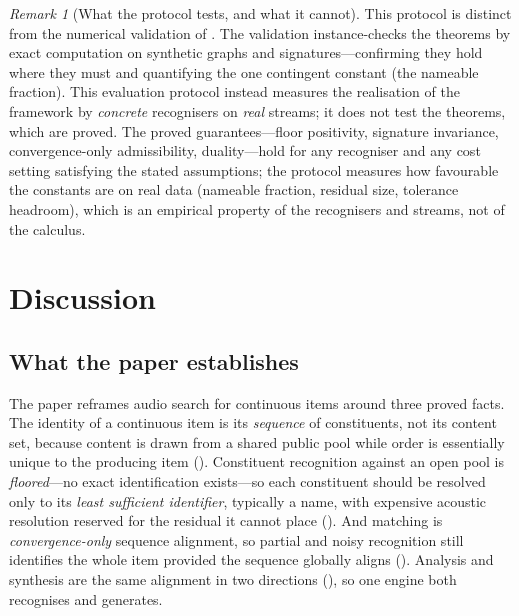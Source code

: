 \documentclass[11pt,twocolumn,a4paper]{article}
\theoremstyle{thmstyle}
\theoremstyle{definition}
\theoremstyle{remark}
\newtheorem{remark}[theorem]{Remark}
\begin{document}
\begin{remark}[What the protocol tests, and what it cannot]
\label{rem:eval-scope}
This protocol is distinct from the numerical validation of .
The validation instance-checks the theorems by exact computation on synthetic
graphs and signatures---confirming they hold where they must and quantifying the
one contingent constant (the nameable fraction). This evaluation protocol instead
measures the realisation of the framework by \emph{concrete} recognisers on
\emph{real} streams; it does not test the theorems, which are proved. The proved
guarantees---floor positivity, signature invariance, convergence-only
admissibility, duality---hold for any recogniser and any cost setting satisfying
the stated assumptions; the protocol measures how favourable the constants are on
real data (nameable fraction, residual size, tolerance headroom), which is an
empirical property of the recognisers and streams, not of the calculus.
\end{remark}

\section{Discussion}
\label{sec:discussion}

\subsection{What the paper establishes}

The paper reframes audio search for continuous items around three proved facts.
The identity of a continuous item is its \emph{sequence} of constituents, not its
content set, because content is drawn from a shared public pool while order is
essentially unique to the producing item (). Constituent
recognition against an open pool is \emph{floored}---no exact identification
exists---so each constituent should be resolved only to its \emph{least
sufficient identifier}, typically a name, with expensive acoustic resolution
reserved for the residual it cannot place (). And matching is \emph{convergence-only} sequence alignment, so
partial and noisy recognition still identifies the whole item provided the
sequence globally aligns (). Analysis and synthesis are
the same alignment in two directions (), so one engine both
recognises and generates.
\end{document}
